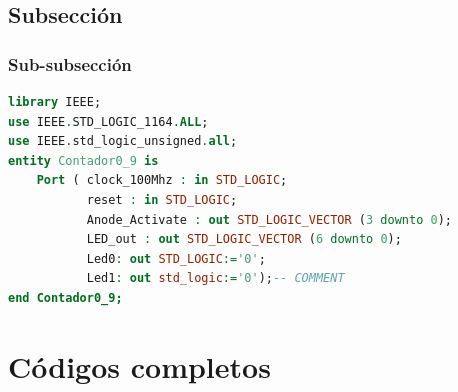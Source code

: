 \documentclass[12pt]{article}  %
\begin{document}
\subsection{Subsección}
\cite{Agarwal2019} %
\subsubsection{Sub-subsección}


\newpage

\begin{lstlisting}[language=VHDL, caption=Código en VHDL]
  library IEEE;
use IEEE.STD_LOGIC_1164.ALL;
use IEEE.std_logic_unsigned.all;
entity Contador0_9 is
    Port ( clock_100Mhz : in STD_LOGIC;
           reset : in STD_LOGIC;
           Anode_Activate : out STD_LOGIC_VECTOR (3 downto 0);
           LED_out : out STD_LOGIC_VECTOR (6 downto 0);
           Led0: out STD_LOGIC:='0';
           Led1: out std_logic:='0');-- COMMENT
end Contador0_9;
\end{lstlisting}

\newpage %
\appendix %
\section{Códigos completos}


\clearpage %
\end{document}
